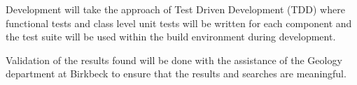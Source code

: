 \documentclass[11pt]{scrartcl}
\begin{document}
	Development will take the approach of Test Driven Development (TDD) where functional tests and class level unit tests will be written for each component and the test suite will be used within the build environment during development.
	
	Validation of the results found will be done with the assistance of the Geology department at Birkbeck to ensure that the results and searches are meaningful.



\end{document}
